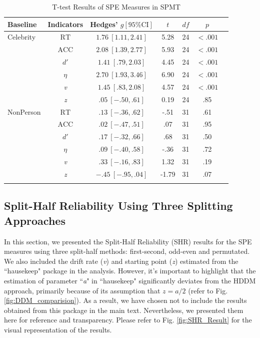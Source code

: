 \documentclass[sn-apa]{sn-jnl}%
\theoremstyle{thmstyleone}%
\theoremstyle{thmstyletwo}%
\theoremstyle{thmstylethree}%
\begin{document}
\begin{table}[!ht]
	\caption{T-test Results of SPE Measures in SPMT}\label{table:t-testresult}
	\label{table:Meta}%
	\begin{tabular}{@{}lcccccc@{}}
		\toprule
		Baseline & Indicators & Hedges’ $g[95\% \text{CI}]$& $t$ & $df$ & $p$\\
		\midrule
		Celebrity &  $\text{RT}$& $1.76\ [1.11, 2.41]$& 5.28& 24 & $<.001$\\
		&  $\text{ACC}$ & $2.08\ [1.39, 2.77]$& 5.93&24&$<.001$ \\
		&  $d'$ &$1.41\ [.79, 2.03] $&4.45&24&$<.001$ \\
		&  $\eta$ & $2.70\ [1.93, 3.46]$&6.90&24&$<.001$ \\
		&  \textit{v} &$1.45\ [.83, 2.08]$ &4.57&24&$<.001$ \\
		&  \textit{z} & $.05\ [-.50, .61]$&0.19&24&.85 \\
		
		NonPerson &  $\text{RT}$ &$.13\ [-.36, .62]$ &-.51&31&.61 \\
		&  $\text{ACC}$ &$.02\ [-.47, .51]$ &.07&31&.95\\
		&  $d'$ & $.17\ [-.32, .66]$ &.68&31&.50\\
		&  $\eta$ & $.09\ [-.40, .58]$&-.36&31&.72 \\
		&  \textit{v} & $.33\ [-.16, .83]$&1.32&31&.19\\
		&  \textit{z} & $-.45\ [-.95, .04]$&-1.79&31&.07 \\
		\botrule
	\end{tabular}
\end{table}

\subsection{Split-Half Reliability Using Three Splitting Approaches}\label{sec:SHR}

In this section, we presented the Split-Half Reliability (SHR) results for the SPE measures using three split-half methods: first-second, odd-even and permutated. We also included the drift rate (\textit{v}) and starting point (\textit{z}) estimated from the ``hausekeep" package in the analysis. However, it's important to highlight that the estimation of parameter ``\textit{a}" in ``hausekeep" significantly deviates from the HDDM approach, primarily because of its assumption that $z = a / 2$ (refer to Fig. \ref{fig:DDM_comparision}). As a result, we have chosen not to include the results obtained from this package in the main text. Nevertheless, we presented them here for reference and transparency. Please refer to Fig. \ref{fig:SHR_Result} for the visual representation of the results.
\clearpage
\end{document}
